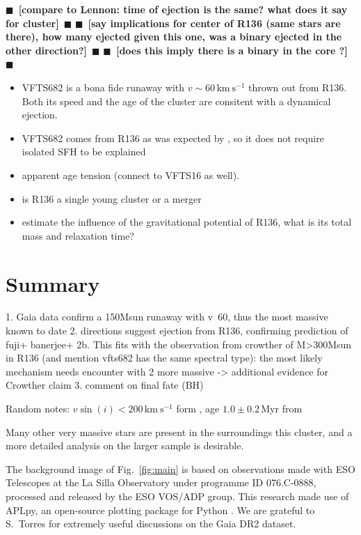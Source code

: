 \documentclass{aa}
\newcommand{\todo}[1]{{\large $\blacksquare$~\textbf{\color{red}[#1]}}~$\blacksquare$}
\DeclareRobustCommand{\Figref}[1]{Fig.~\ref{#1}}
\begin{document}
\todo{compare to Lennon: time of ejection is the same? what does it
  say for cluster}
\todo{say implications for center of R136 (same stars are there), how
  many ejected given this one, was a binary ejected in the other direction?}
\todo{does this imply there is a binary in the core ?}
\begin{itemize}
\item VFTS682 is a bona fide runaway with $v\sim60\,\mathrm{km\
    s^{-1}}$ thrown out from R136. Both its speed and the age of the
  cluster are consitent with a dynamical ejection.
  \item VFTS682 comes from R136 as was expected by
  \cite{bestenlehner:11, fujii:11, banerjee:12}, so it does not
  require isolated SFH to be explained
\item apparent age tension (connect to VFTS16 as well).
\item is R136 a single young cluster or a merger
\item estimate the influence of the gravitational potential of R136,
  what is its total mass and relaxation time?
\end{itemize}
\section{Summary}

1. Gaia data confirm a 150Msun runaway with v~60, thus the most
massive known to date
2. directions suggest ejection from R136, confirming prediction of
fuji+ banerjee+
2b. This fits with the observation from crowther of M>300Msun in R136
(and mention vfts682 has the same spectral type): the most likely
mechanism needs encounter with 2 more massive -> additional evidence
for Crowther claim
3. comment on final fate (BH)

Random notes: $v\sin(i)<200\,\mathrm{km\ s^{-1}}$ form \cite{schneider:18}, age $1.0\pm 0.2$\,Myr
from \cite{schneider:18}

Many other very massive stars are present in the surroundings this cluster, and a more
detailed analysis on the larger sample is desirable.





\begin{acknowledgements}
  The background image of \Figref{fig:main} is based on observations
  made with ESO Telescopes at the La Silla Observatory under programme
  ID 076.C-0888, processed and released by the ESO VOS/ADP group.
  This research made use of APLpy, an open-source plotting package for Python \cite{robitaille:12}.
  We are grateful to S.~Torres for extremely useful discussions on the
  Gaia DR2 dataset.
\end{acknowledgements}
\end{document}
